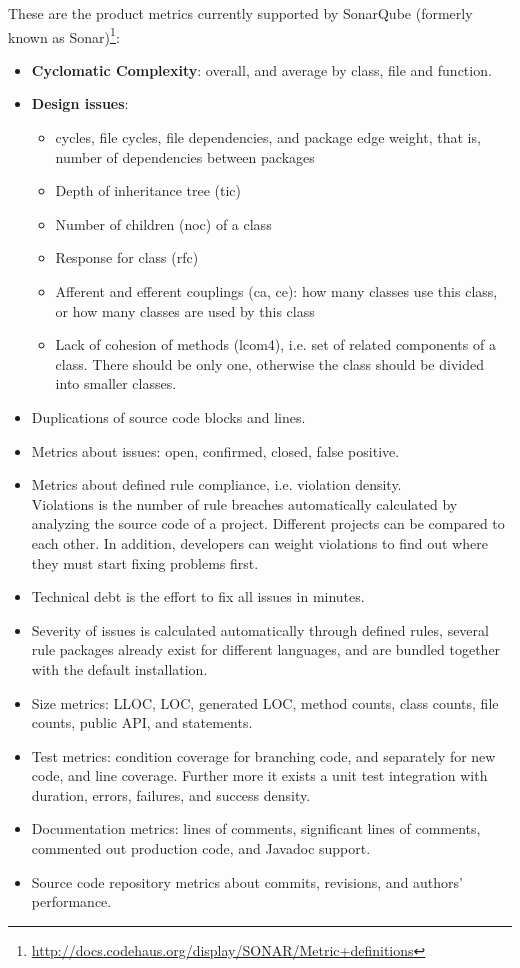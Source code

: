 These are the product metrics currently supported by SonarQube (formerly known
as Sonar)\footnote{\url{http://docs.codehaus.org/display/SONAR/Metric+definitions}}:
\begin{itemize}
	\item \textbf{Cyclomatic Complexity}: overall, and average by class, file and function.
	\item \textbf{Design issues}: 
	\begin{itemize}
		\item cycles, file cycles, file dependencies, and package edge weight, 
		that is, number of dependencies between packages
		\item Depth of inheritance tree (tic)
		\item Number of children (noc) of a class
		\item Response for class (rfc) 
		\item Afferent and efferent couplings (ca, ce): how many classes use 
		this class, or how many classes are used by this class
		\item Lack of cohesion of methods (lcom4), i.e. set of related 
		components of a class. There should be only one, otherwise the class should be divided into smaller classes.
	\end{itemize}
	\item Duplications of source code blocks and lines.
	\item Metrics about issues: open, confirmed, closed, false positive.
	\item Metrics about defined rule compliance, i.e. violation density. \\
	Violations is the number of rule breaches automatically calculated by
	analyzing the source code of a project. Different projects can be compared to each other. In addition, developers can weight violations to find out where they must start fixing problems first.
	\item Technical debt is the effort to fix all issues in minutes.
	\item Severity of issues is calculated automatically through defined rules,
	several rule packages already exist for different languages, and are bundled
	together with the default installation.
	\item Size metrics: LLOC, LOC, generated LOC, method counts, class counts, 
	file counts, public API, and statements.
	\item Test metrics: condition coverage for branching code, and separately 
	for new code, and line coverage. Further more it exists a unit test 
	integration with duration, errors, failures, and success density.
	\item Documentation metrics: lines of comments, significant lines of comments, commented out production code, and Javadoc support.
	\item Source code repository metrics about commits, revisions, and authors'
	performance.
\end{itemize}

